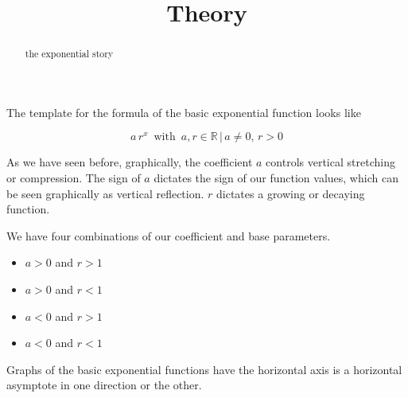 \documentclass{ximera}
\title{Theory}
\begin{document}
\begin{abstract}
the exponential story
\end{abstract}
\maketitle










The template for the formula of the basic exponential function looks like




\[  a \, r^x   \, \text{ with } \,  a, r \in \mathbb{R} \, | \,  a \ne 0, \, r > 0   \]


As we have seen before, graphically, the coefficient $a$ controls vertical stretching or compression. The sign of $a$ dictates the sign of our function values, which can be seen graphically as vertical reflection. $r$ dictates a growing or decaying function.




We have four combinations of our coefficient and base parameters.

\begin{itemize}
\item $a>0$ and $r>1$
\item $a>0$ and $r<1$
\item $a<0$ and $r>1$
\item $a<0$ and $r<1$
\end{itemize}


Graphs of the basic exponential functions have the horizontal axis is a horizontal asymptote in one direction or the other.
\end{document}
